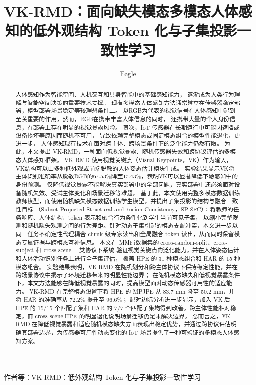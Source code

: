 \documentclass[journal]{IEEEtran}
\begin{document}
\title{VK-RMD：面向缺失模态多模态人体感知的低外观结构 Token 化与子集投影一致性学习}

\author{Eagle}

%
{作者等：VK-RMD：低外观结构 Token 化与子集投影一致性学习}

\maketitle

\begin{abstract}
人体感知作为智能空间、人机交互和具身智能中的基础感知能力，
逐渐成为人类行为理解与智能空间决策的重要技术支撑。
现有多模态人体感知方法通常建立在传感器稳定部署，模型部署场景稳定等较理想条件上。
以RGB为代表的视觉信号在人体感知中起到至关重要的作用，然而，RGB在携带丰富人体信息的同时，
还携带大量的个人身份信息，在部署上存在明显的视觉暴露风险。
其次，IoT 传感器在长期运行中可能因遮挡或设备损坏等原因而随机不可用，
导致依赖完整模态或固定模态组合的模型性能退化，更进一步，
人体感知现有技术在面对跨主体、跨场景条件下的泛化能力仍然有限。
为此，本文提出 VK-RMD，一种面向低视觉暴露、随机传感器失效和跨协议评估的多模态人体感知框架。
VK-RMD 使用视觉关键点（Visual Keypoints，VK）作为输入，
VK结构可以由多种低外观或前端脱敏的人体姿态估计模块生成。
实验结果显示VK将主体识别准确率从脱敏RGB的67.53\%降至15.43\%，表明VK可以显著降低下游感知中的身份预测。
仅降低视觉暴露不能解决真实部署中的全部问题，真实部署中还必须面对设备随机失效、受试主体变化和场景迁移等难题，
基于此，本文使用完整多模态数据训练教师模型，而使用随机缺失模态数据训练学生模型，并提出子集投影的结构与融合一致性目标
（Subset-Projected Structural and Fusion Consistency，SP-SFC）：将教师的任务响应、人体结构、token 表示和融合行为条件化到学生当前可见子集，
以缩小完整观测和随机缺失观测之间的行为差距。针对动态子集引起的模态支配冲突，本文进一步以同一任务不确定性代理耦合
chunk 级专家读出和全局融合 token 读出，从而同时保留模态专属证据与跨模态互补信息。
本文在 MMFi数据集的 cross-random-split、cross-subject 和 cross-scene 三类协议下系统
验证视觉关键点的泛化能力，并在人体姿态估计和人体活动识别任务上进行全子集评估，
覆盖 HPE 的 31 种模态组合和 HAR 的 15 种模态组合。
实验结果表明，VK-RMD 在随机划分和跨主体协议下保持稳定性能，并在跨场景协议中揭示了环境迁移带来的明显性能边界；
在随机模态缺失和低视觉暴露条件下，本文方法能够在降低视觉暴露的同时，提高模型面对动态传感器可用性的适应能力。
VK-RMD 在完整模态设置下将 HPE 的 MPJPE 从 83.7 mm 降至 50.2 mm，并将 HAR 的准确率从 72.2\% 提升至 96.6\%；
配对边际分析进一步显示，加入 VK 后 HPE 的 15/15 个匹配子集和 HAR 的 7/7 个匹配子集均得到改善。跨主体性能相对稳定，而 cross-scene HPE 的明显退化说明场景迁移仍是未解决边界。
总而言之，VK-RMD 在降低视觉暴露和适应随机模态缺失方面表现出稳定优势，并通过跨协议评估明确其部署边界，为传感器可用性动态变化的 IoT 场景提供了一种可验证的多模态人体感知方案。
\end{abstract}
    
\end{document}
